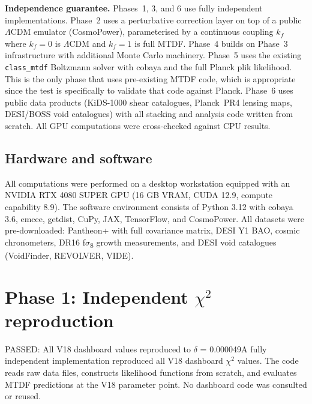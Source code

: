 \documentclass[11pt,a4paper]{article}
\begin{document}
\begin{mdframed}[linecolor=accent,linewidth=0.5pt,backgroundcolor=callout-bg,leftline=true,rightline=true,topline=true,bottomline=true,innerleftmargin=8pt,innerrightmargin=8pt,innertopmargin=6pt,innerbottommargin=6pt]
\textbf{Independence guarantee.}
Phases~1, 3, and 6 use fully independent implementations. Phase~2 uses a perturbative correction layer on top of a public $\Lambda$CDM emulator (CosmoPower), parameterised by a continuous coupling \( k_f \) where \( k_f = 0 \) is $\Lambda$CDM and \( k_f = 1 \) is full MTDF. Phase~4 builds on Phase~3 infrastructure with additional Monte Carlo machinery. Phase~5 uses the existing \texttt{class\_\allowbreak{}mtdf} Boltzmann solver with cobaya and the full Planck plik likelihood. This is the only phase that uses pre-existing MTDF code, which is appropriate since the test is specifically to validate that code against Planck. Phase~6 uses public data products (KiDS-1000 shear catalogues, Planck~PR4 lensing maps, DESI/\allowbreak{}BOSS void catalogues) with all stacking and analysis code written from scratch. All GPU computations were cross-checked against CPU results.
\end{mdframed}

\subsection{Hardware and software}
All computations were performed on a desktop workstation equipped with an NVIDIA RTX 4080 SUPER GPU (16 GB VRAM, CUDA 12.9, compute capability 8.9). The software environment consists of Python 3.12 with cobaya 3.6, emcee, getdist, CuPy, JAX, TensorFlow, and CosmoPower. All datasets were pre-downloaded: Pantheon+ with full covariance matrix, DESI Y1 BAO, cosmic chronometers, DR16 f$\sigma$\textsubscript{8} growth measurements, and DESI void catalogues (VoidFinder, REVOLVER, VIDE).

\section{Phase 1: Independent $\chi$$^{2}$ reproduction}
\label{sec:sec2}
PASSED: All V18 dashboard values reproduced to $\delta$ = 0.000049A fully independent implementation reproduced all V18 dashboard $\chi$$^{2}$ values. The code reads raw data files, constructs likelihood functions from scratch, and evaluates MTDF predictions at the V18 parameter point. No dashboard code was consulted or reused.
\end{document}
